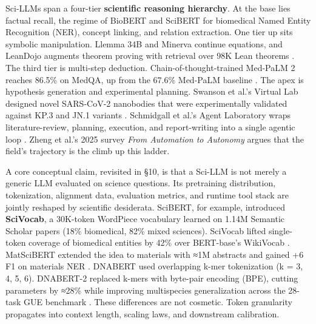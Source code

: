 \documentclass{article}
\begin{document}
Sci-LLMs span a four-tier \textbf{scientific reasoning hierarchy}. At the base lies factual recall, the regime of BioBERT \cite{lee2019bioinformatics2019} and SciBERT \cite{beltagy2019arxiv1903106762019} for biomedical Named Entity Recognition (NER), concept linking, and relation extraction. One tier up sits symbolic manipulation. Llemma 34B \cite{azerbayev2023llemmaanopenlangua} and Minerva continue equations, and LeanDojo augments theorem proving with retrieval over 98K Lean theorems \cite{yang2023leandojotheorempro}. The third tier is multi-step deduction. Chain-of-thought-trained Med-PaLM 2 reaches 86.5\% on MedQA, up from the 67.6\% Med-PaLM baseline \cite{singhal2025towardexpertlevelm,singhal2023largelanguagemodel}. The apex is hypothesis generation and experimental planning. Swanson et al.'s Virtual Lab designed novel SARS-CoV-2 nanobodies that were experimentally validated against KP.3 and JN.1 variants \cite{swanson2024thevirtuallabaiage}. Schmidgall et al.'s Agent Laboratory wraps literature-review, planning, execution, and report-writing into a single agentic loop \cite{schmidgall2025agentlaboratoryusi}. Zheng et al.'s 2025 survey \emph{From Automation to Autonomy} \cite{zheng2025fromautomationtoau} argues that the field's trajectory is the climb up this ladder.

A core conceptual claim, revisited in §10, is that a Sci-LLM is not merely a generic LLM evaluated on science questions. Its pretraining distribution, tokenization, alignment data, evaluation metrics, and runtime tool stack are jointly reshaped by scientific desiderata. SciBERT, for example, introduced \textbf{SciVocab}, a 30K-token WordPiece vocabulary learned on 1.14M Semantic Scholar papers (18\% biomedical, 82\% mixed sciences). SciVocab lifted single-token coverage of biomedical entities by 42\% over BERT-base's WikiVocab \cite{beltagy2019arxiv1903106762019}. MatSciBERT extended the idea to materials with ≈1M abstracts and gained +6 F1 on materials NER \cite{gupta2022matscibertamateria}. DNABERT used overlapping k-mer tokenization (k = 3, 4, 5, 6). DNABERT-2 replaced k-mers with byte-pair encoding (BPE), cutting parameters by ≈28\% while improving multispecies generalization across the 28-task GUE benchmark \cite{ji2020biorxiv2020,zhou2023arxiv2306150062023}. These differences are not cosmetic. Token granularity propagates into context length, scaling laws, and downstream calibration.
\end{document}
